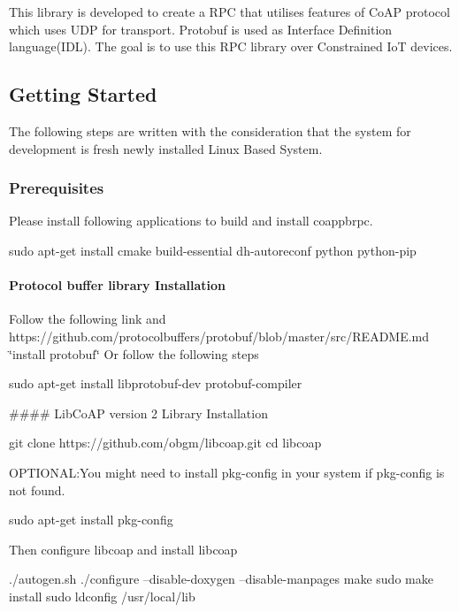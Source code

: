 \href{https://scan.coverity.com/projects/sajanshakya129-coappbrpc}{\tt }

This library is developed to create a R\+PC that utilises features of Co\+AP protocol which uses U\+DP for transport. Protobuf is used as Interface Definition language(\+I\+D\+L). The goal is to use this R\+PC library over Constrained IoT devices.

\subsection*{Getting Started}

The following steps are written with the consideration that the system for development is fresh newly installed Linux Based System.

\subsubsection*{Prerequisites}

Please install following applications to build and install coappbrpc. 
\begin{DoxyCode}
sudo apt-get install cmake build-essential dh-autoreconf python python-pip
\end{DoxyCode}
 \paragraph*{Protocol buffer library Installation}

Follow the following link and https\+://github.com/protocolbuffers/protobuf/blob/master/src/\+R\+E\+A\+D\+M\+E.\+md \char`\"{}install protobuf\char`\"{} Or follow the following steps 
\begin{DoxyCode}
sudo apt-get install libprotobuf-dev protobuf-compiler
\end{DoxyCode}


\#\#\#\# Lib\+Co\+AP version 2 Library Installation 
\begin{DoxyCode}
git clone https://github.com/obgm/libcoap.git
cd libcoap
\end{DoxyCode}
 O\+P\+T\+I\+O\+N\+AL\+:You might need to install pkg-\/config in your system if \textquotesingle{}pkg-\/config\textquotesingle{} is not found. 
\begin{DoxyCode}
sudo apt-get install pkg-config
\end{DoxyCode}
 Then configure libcoap and install libcoap 
\begin{DoxyCode}
./autogen.sh
./configure --disable-doxygen --disable-manpages
make
sudo make install
sudo ldconfig /usr/local/lib
\end{DoxyCode}


